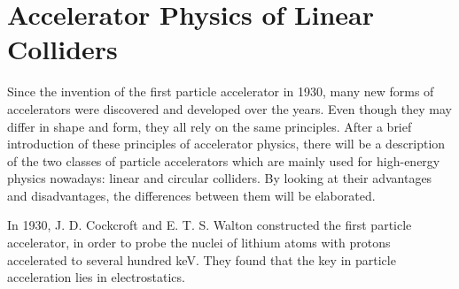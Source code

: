 \chapter{Accelerator Physics of Linear Colliders}
\label{LinearColliderPhysics}

\begin{chapterabstract}
Since the invention of the first particle accelerator in 1930, many new forms of accelerators were discovered and developed over the years. 
Even though they may differ in shape and form, they all rely on the same principles. 
After a brief introduction of these principles of accelerator physics, there will be a description of the two classes of particle accelerators which are mainly used for high-energy physics nowadays: linear and circular colliders. 
By looking at their advantages and disadvantages, the differences between them will be elaborated.
\end{chapterabstract}
\newline

In 1930, J. D. Cockcroft and E. T. S. Walton constructed the first particle accelerator, in order to probe the nuclei of lithium atoms with protons accelerated to several hundred keV. 
They found that the key in particle acceleration lies in electrostatics.

